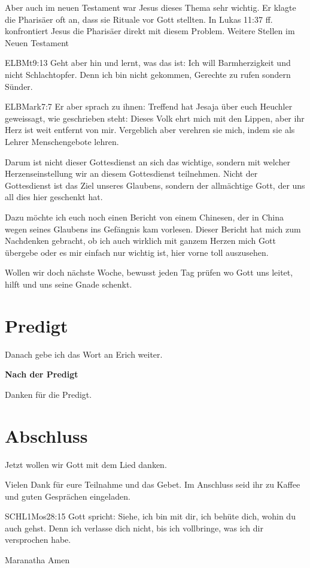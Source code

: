 \begin{spacing}{1.5}
Aber auch im neuen Testament war Jesus dieses Thema sehr wichtig.
Er klagte die Pharisäer oft an, dass sie Rituale vor Gott stellten. In Lukas 11:37 ff. konfrontiert Jesus die Pharisäer direkt mit diesem Problem. Weitere Stellen im Neuen Testament
\begin{bibelbox}{ELB}{Mt}{9:13}
Geht aber hin und lernt, was das ist: \glqq Ich will Barmherzigkeit und nicht Schlachtopfer.\grqq{} Denn ich bin nicht gekommen, Gerechte zu rufen sondern Sünder.
\end{bibelbox}
\begin{bibelbox}{ELB}{Mark}{7:7}
Er aber sprach zu ihnen: Treffend hat Jesaja über euch Heuchler geweissagt, wie geschrieben steht: \glqq Dieses Volk ehrt mich mit den Lippen, aber ihr Herz ist weit entfernt von mir. Vergeblich aber verehren sie mich, indem sie als Lehrer Menschengebote lehren.\grqq{}
\end{bibelbox}
Darum ist nicht dieser Gottesdienst an sich das wichtige, sondern mit welcher Herzenseinstellung wir an diesem Gottesdienst teilnehmen. Nicht der Gottesdienst ist das Ziel unseres Glaubens, sondern der allmächtige Gott, der uns all dies hier geschenkt hat. 

Dazu möchte ich euch noch einen Bericht von einem Chinesen, der in China wegen seines Glaubens ins Gefängnis kam vorlesen. Dieser Bericht hat mich zum Nachdenken gebracht, ob ich auch wirklich mit ganzem Herzen mich Gott übergebe oder es mir einfach nur wichtig ist, hier vorne toll auszusehen.


Wollen wir doch nächste Woche, bewusst jeden Tag prüfen wo Gott uns leitet, hilft und uns seine Gnade schenkt.

\end{spacing}


\section{Predigt}

Danach gebe ich das Wort an Erich weiter.

\textbf{Nach der Predigt}

Danken für die Predigt.

\section{Abschluss}

Jetzt wollen wir Gott mit dem Lied  danken.


Vielen Dank für eure Teilnahme und das Gebet. Im Anschluss seid ihr zu Kaffee und guten Gesprächen eingeladen.
\beten{}

\begin{bibelbox}{SCHL}{1Mos}{28:15}
Gott spricht: Siehe, ich bin mit dir,
ich behüte dich, wohin du auch gehst.
Denn ich verlasse dich nicht,
bis ich vollbringe, was ich dir versprochen habe.
\end{bibelbox}

Maranatha Amen
